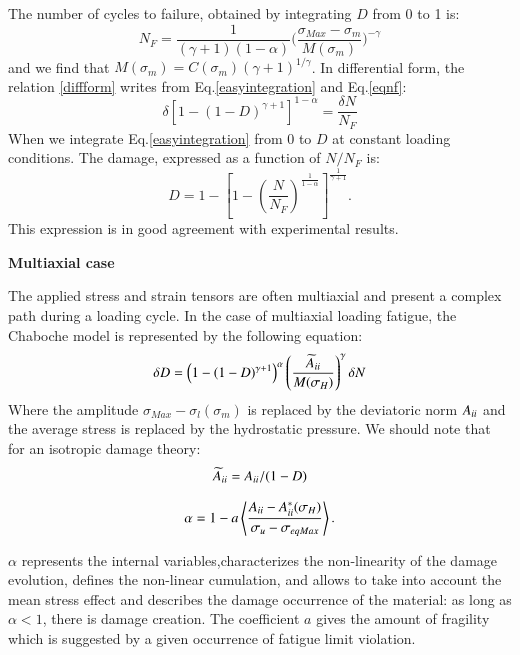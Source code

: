 \documentclass[3p,times,procedia,number]{elsarticle}
\begin{document}
The number of cycles to failure, obtained by integrating $D$ from 0 to 1 is:
\begin{equation}N_F=\frac{1}{(\gamma+1)(1-\alpha)}\big(\frac{\sigma_{Max}-\sigma_m}{M(\sigma_m)}\big)^{-\gamma}
\label{eqnf}
\end{equation}
and we find that $M(\sigma_m)=C(\sigma_m)(\gamma+1)^{1/\gamma}$. 
In differential form, the relation \eqref{diffform} writes from Eq.\eqref{easyintegration} and Eq.\eqref{eqnf}:
\begin{equation}\delta [1-(1-D)^{\gamma+1}]^{1-\alpha}=\frac{\delta N}{N_F}
\label{diffform}
\end{equation}
When we integrate Eq.\eqref{easyintegration} from $0$ to $D$ at constant loading conditions. The damage, expressed as a function of $N/N_F$ is:
\begin{equation}D=1-\left[ 1-\left( \frac{N}{N_F}\right) ^{\frac{1}{1-\alpha}}\right] ^{\frac{1}{\gamma+1}}.
\end{equation}
This expression is in good agreement with experimental results\cite{lemaitre1990mechanics}. 



\vspace{6pt}
\textbf{Multiaxial case}
\vspace{6pt}

The applied stress and strain tensors are often multiaxial and present a complex path during a loading cycle. In the case of multiaxial loading fatigue, the Chaboche model is represented by the following equation:
\begin{equation}\delta D = \left( 1 -(1-D)^{\gamma+1}\right)^\alpha \left(\frac{\widetilde{A}_{\uppercase\expandafter{\romannumeral2}}}{M(\sigma_H)}\right)^\gamma \delta N
\label{chabochemulti}
\end{equation} 
Where the amplitude $\sigma_{Max}-\sigma_l(\sigma_m)$ is replaced by the deviatoric norm $A_{\uppercase\expandafter{\romannumeral2}}$ and the average stress is replaced by the hydrostatic pressure. We should note that for an isotropic damage theory:
$$\widetilde{A}_{\uppercase\expandafter{\romannumeral2}}=A_{\uppercase\expandafter{\romannumeral2}}/(1-D)$$

\begin{equation}\alpha = 1 - a\left\langle \frac{A_{\uppercase\expandafter{\romannumeral2}} - A_{\uppercase\expandafter{\romannumeral2}}^\ast(\sigma_H)}{ \sigma_{u} - \sigma_{eqMax}}\right\rangle.\end{equation}

$\alpha$ represents the internal variables,characterizes the non-linearity of the damage evolution, defines
the non-linear cumulation, and allows to take into account the mean stress effect and describes the damage occurrence of the material: as long as $\alpha < 1$, there is damage creation. The coefficient $a$ gives the amount of fragility which is suggested by a given occurrence of fatigue limit violation.
\end{document}
